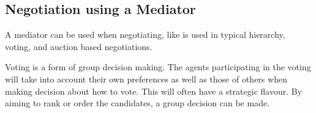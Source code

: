 




\subsection{Negotiation using a Mediator}
A mediator can be used when negotiating, like is used in typical hierarchy, voting, and auction based negotiations. 

Voting is a form of group decision making. The agents participating in the voting will take into account their own preferences as well as those of others when making decision about how to vote. This will often have a strategic flavour. By aiming to rank or order the candidates, a group decision can be made.

